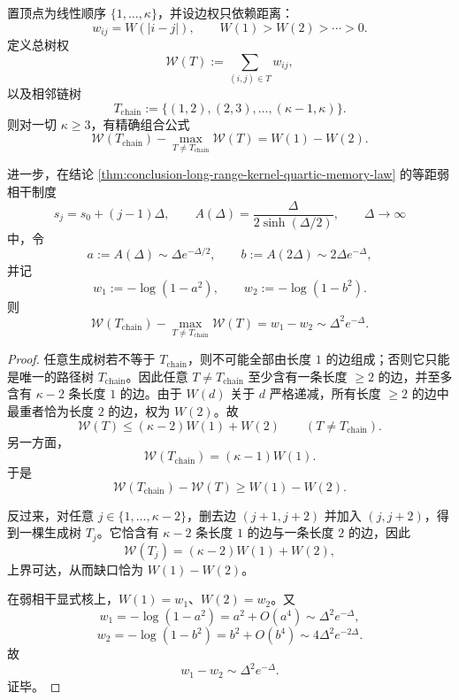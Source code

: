 \begin{theorem}[等距弱相干相中的链树刚性缺口]\label{thm:conclusion-weak-coherence-chain-tree-gap}
置顶点为线性顺序 \(\{1,\dots,\kappa\}\)，并设边权只依赖距离：
\[
w_{ij}=W(|i-j|),
\qquad
W(1)>W(2)>\cdots>0.
\]
定义总树权
\[
\mathcal W(T):=\sum_{(i,j)\in T}w_{ij},
\]
以及相邻链树
\[
T_{\mathrm{chain}}:=\{(1,2),(2,3),\dots,(\kappa-1,\kappa)\}.
\]
则对一切 \(\kappa\ge 3\)，有精确组合公式
\[
\mathcal W(T_{\mathrm{chain}})
-\max_{T\neq T_{\mathrm{chain}}}\mathcal W(T)
=
W(1)-W(2).
\]

进一步，在结论 \ref{thm:conclusion-long-range-kernel-quartic-memory-law} 的等距弱相干制度
\[
s_j=s_0+(j-1)\Delta,
\qquad
A(\Delta)=\frac{\Delta}{2\sinh(\Delta/2)},
\qquad
\Delta\to\infty
\]
中，令
\[
a:=A(\Delta)\sim \Delta e^{-\Delta/2},
\qquad
b:=A(2\Delta)\sim 2\Delta e^{-\Delta},
\]
并记
\[
w_1:=-\log(1-a^2),
\qquad
w_2:=-\log(1-b^2).
\]
则
\[
\mathcal W(T_{\mathrm{chain}})
-\max_{T\neq T_{\mathrm{chain}}}\mathcal W(T)
=
w_1-w_2
\sim
\Delta^2e^{-\Delta}.
\]
\end{theorem}
\begin{proof}
任意生成树若不等于 \(T_{\mathrm{chain}}\)，则不可能全部由长度 \(1\) 的边组成；否则它只能是唯一的路径树 \(T_{\mathrm{chain}}\)。因此任意 \(T\neq T_{\mathrm{chain}}\) 至少含有一条长度 \(\ge 2\) 的边，并至多含有 \(\kappa-2\) 条长度 \(1\) 的边。由于 \(W(d)\) 关于 \(d\) 严格递减，所有长度 \(\ge 2\) 的边中最重者恰为长度 \(2\) 的边，权为 \(W(2)\)。故
\[
\mathcal W(T)\le (\kappa-2)W(1)+W(2)
\qquad (T\neq T_{\mathrm{chain}}).
\]
另一方面，
\[
\mathcal W(T_{\mathrm{chain}})=(\kappa-1)W(1).
\]
于是
\[
\mathcal W(T_{\mathrm{chain}})-\mathcal W(T)\ge W(1)-W(2).
\]

反过来，对任意 \(j\in\{1,\dots,\kappa-2\}\)，删去边 \((j+1,j+2)\) 并加入 \((j,j+2)\)，得到一棵生成树 \(T_j\)。它恰含有 \(\kappa-2\) 条长度 \(1\) 的边与一条长度 \(2\) 的边，因此
\[
\mathcal W(T_j)=(\kappa-2)W(1)+W(2),
\]
上界可达，从而缺口恰为 \(W(1)-W(2)\)。

在弱相干显式核上，\(W(1)=w_1\)、\(W(2)=w_2\)。又
\[
w_1=-\log(1-a^2)=a^2+O(a^4)\sim \Delta^2e^{-\Delta},
\]
\[
w_2=-\log(1-b^2)=b^2+O(b^4)\sim 4\Delta^2e^{-2\Delta}.
\]
故
\[
w_1-w_2\sim \Delta^2e^{-\Delta}.
\]
证毕。
\end{proof}

